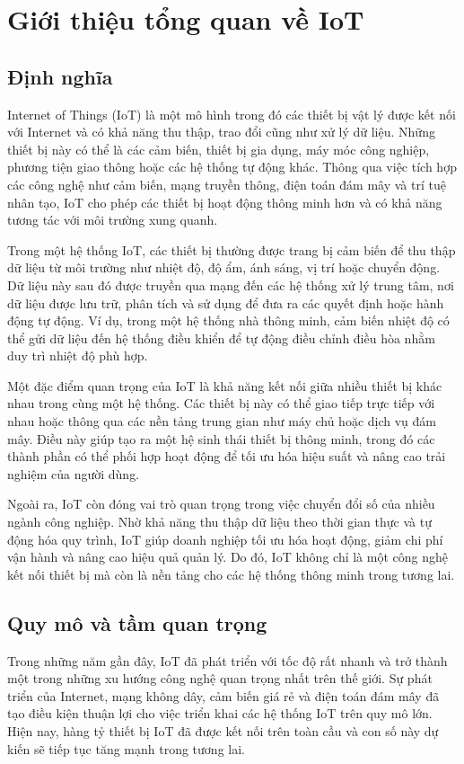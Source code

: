 \section{Giới thiệu tổng quan về IoT}

\subsection{Định nghĩa}
Internet of Things (IoT) là một mô hình trong đó các thiết bị vật lý được kết nối với Internet và có khả năng thu thập, trao đổi cũng như xử lý dữ liệu. Những thiết bị này có thể là các cảm biến, thiết bị gia dụng, máy móc công nghiệp, phương tiện giao thông hoặc các hệ thống tự động khác. Thông qua việc tích hợp các công nghệ như cảm biến, mạng truyền thông, điện toán đám mây và trí tuệ nhân tạo, IoT cho phép các thiết bị hoạt động thông minh hơn và có khả năng tương tác với môi trường xung quanh.

Trong một hệ thống IoT, các thiết bị thường được trang bị cảm biến để thu thập dữ liệu từ môi trường như nhiệt độ, độ ẩm, ánh sáng, vị trí hoặc chuyển động. Dữ liệu này sau đó được truyền qua mạng đến các hệ thống xử lý trung tâm, nơi dữ liệu được lưu trữ, phân tích và sử dụng để đưa ra các quyết định hoặc hành động tự động. Ví dụ, trong một hệ thống nhà thông minh, cảm biến nhiệt độ có thể gửi dữ liệu đến hệ thống điều khiển để tự động điều chỉnh điều hòa nhằm duy trì nhiệt độ phù hợp.

Một đặc điểm quan trọng của IoT là khả năng kết nối giữa nhiều thiết bị khác nhau trong cùng một hệ thống. Các thiết bị này có thể giao tiếp trực tiếp với nhau hoặc thông qua các nền tảng trung gian như máy chủ hoặc dịch vụ đám mây. Điều này giúp tạo ra một hệ sinh thái thiết bị thông minh, trong đó các thành phần có thể phối hợp hoạt động để tối ưu hóa hiệu suất và nâng cao trải nghiệm của người dùng.

Ngoài ra, IoT còn đóng vai trò quan trọng trong việc chuyển đổi số của nhiều ngành công nghiệp. Nhờ khả năng thu thập dữ liệu theo thời gian thực và tự động hóa quy trình, IoT giúp doanh nghiệp tối ưu hóa hoạt động, giảm chi phí vận hành và nâng cao hiệu quả quản lý. Do đó, IoT không chỉ là một công nghệ kết nối thiết bị mà còn là nền tảng cho các hệ thống thông minh trong tương lai.
\subsection{Quy mô và tầm quan trọng}
Trong những năm gần đây, IoT đã phát triển với tốc độ rất nhanh và trở thành một trong những xu hướng công nghệ quan trọng nhất trên thế giới. Sự phát triển của Internet, mạng không dây, cảm biến giá rẻ và điện toán đám mây đã tạo điều kiện thuận lợi cho việc triển khai các hệ thống IoT trên quy mô lớn. Hiện nay, hàng tỷ thiết bị IoT đã được kết nối trên toàn cầu và con số này dự kiến sẽ tiếp tục tăng mạnh trong tương lai.

